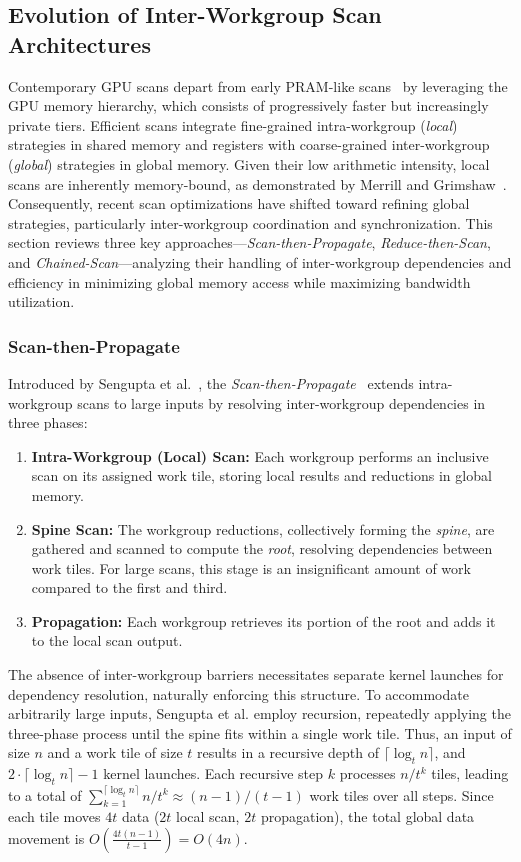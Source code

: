 \documentclass[sigconf]{acmart}
\begin{document}
\subsection{Evolution of Inter-Workgroup Scan Architectures}
Contemporary GPU scans depart from early PRAM-like scans~\cite{Blelloch:1989:SAP} by leveraging the GPU memory hierarchy, which consists of progressively faster but increasingly private tiers. Efficient scans integrate fine-grained intra-workgroup (\emph{local}) strategies in shared memory and registers with coarse-grained inter-workgroup (\emph{global}) strategies in global memory. Given their low arithmetic intensity, local scans are inherently memory-bound, as demonstrated by Merrill and Grimshaw~\cite{Merrill2009}. Consequently, recent scan optimizations have shifted toward refining global strategies, particularly inter-workgroup coordination and synchronization. This section reviews three key approaches---\emph{Scan-then-Propagate}, \emph{Reduce-then-Scan}, and \emph{Chained-Scan}---analyzing their handling of inter-workgroup dependencies and efficiency in minimizing global memory access while maximizing bandwidth utilization.

\subsubsection{Scan-then-Propagate}
Introduced by Sengupta et al.~\cite{10.5555/1280094.1280110}, the \emph{Scan-then-Propagate}~\cite{GPUGems3, Sengupta2011} extends intra-workgroup scans to large inputs by resolving inter-workgroup dependencies in three phases:
\begin{enumerate}
  \item \textbf{Intra-Workgroup (Local) Scan:}  Each workgroup performs an inclusive scan on its assigned work tile, storing local results and reductions in global memory.
  \item \textbf{Spine Scan:} The workgroup reductions, collectively forming the \emph{spine}, are gathered and scanned to compute the \emph{root}, resolving dependencies between work tiles. For large scans, this stage is an insignificant amount of work compared to the first and third.
  \item \textbf{Propagation:} Each workgroup retrieves its portion of the root and adds it to the local scan output.
\end{enumerate}
The absence of inter-workgroup barriers necessitates separate kernel launches for dependency resolution, naturally enforcing this structure. To accommodate arbitrarily large inputs, Sengupta et al. employ recursion, repeatedly applying the three-phase process until the spine fits within a single work tile. Thus, an input of size $n$ and a work tile of size $t$ results in a recursive depth of $\lceil \log_t n \rceil$, and $2\cdot\lceil \log_t n \rceil - 1$ kernel launches. Each recursive step $k$ processes $n/t^k$ tiles, leading to a total of $\sum_{k=1}^{\lceil \log_t n \rceil} n/t^k \approx (n - 1)/(t - 1)$ work tiles over all steps. Since each tile moves $4t$ data ($2t$ local scan, $2t$ propagation), the total global data movement is $O\left(\frac{4t(n - 1)}{t - 1}\right) = O(4n)$.
\end{document}
